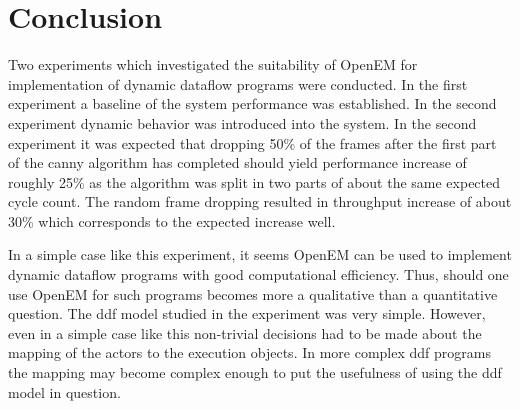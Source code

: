 \documentclass[a4paper,10pt]{article}
\begin{document}
\section{Conclusion}
Two experiments which investigated the suitability of OpenEM for implementation of dynamic dataflow programs were conducted. In the first experiment a baseline of the system performance was established. In the second experiment dynamic behavior was introduced into the system. In the second experiment it was expected that dropping 50\% of the frames after the first part of the canny algorithm has completed should yield performance increase of roughly 25\% as the algorithm was split in two parts of about the same expected cycle count. The random frame dropping resulted in throughput increase of about 30\% which corresponds to the expected increase well.

In a simple case like this experiment, it seems OpenEM can be used to implement dynamic dataflow programs with good computational efficiency. Thus, should one use OpenEM for such programs becomes more a qualitative than a quantitative question. The ddf model studied in the experiment was very simple. However, even in a simple case like this non-trivial decisions had to be made about the mapping of the actors to the execution objects. In more complex ddf programs the mapping may become complex enough to put the usefulness of using the ddf model in question.
\end{document}
